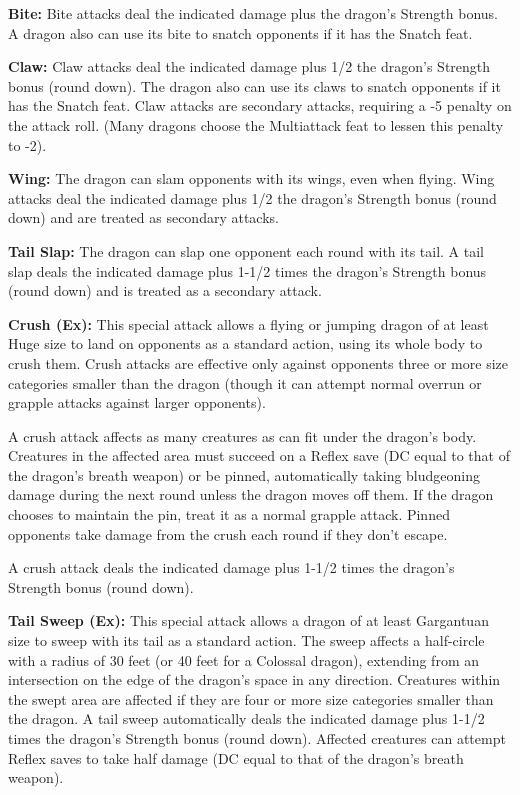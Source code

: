\documentclass{article}
\begin{document}
\textbf{Bite:} Bite attacks deal the indicated damage plus the dragon's Strength 
bonus. A dragon also can use its bite to snatch opponents if it has the Snatch 
feat.

\textbf{Claw:} Claw attacks deal the indicated damage plus 1/2 the dragon's Strength 
bonus (round down). The dragon also can use its claws to snatch opponents if it 
has the Snatch feat. Claw attacks are secondary attacks, requiring a -5 penalty 
on the attack roll. (Many dragons choose the Multiattack feat to lessen this penalty 
to -2).

\textbf{Wing:} The dragon can slam opponents with its wings, even when flying. 
Wing attacks deal the indicated damage plus 1/2 the dragon's Strength bonus (round 
down) and are treated as secondary attacks.

\textbf{Tail Slap:} The dragon can slap one opponent each round with its tail. 
A tail slap deals the indicated damage plus 1-1/2 times the dragon's Strength bonus 
(round down) and is treated as a secondary attack.

\textbf{Crush (Ex):} This special attack allows a flying or jumping dragon of at 
least Huge size to land on opponents as a standard action, using its whole body 
to crush them. Crush attacks are effective only against opponents three or more 
size categories smaller than the dragon (though it can attempt normal overrun or 
grapple attacks against larger opponents).

A crush attack affects as many creatures as can fit under the dragon's body. Creatures 
in the affected area must succeed on a Reflex save (DC equal to that of the dragon's 
breath weapon) or be pinned, automatically taking bludgeoning damage during the 
next round unless the dragon moves off them. If the dragon chooses to maintain 
the pin, treat it as a normal grapple attack. Pinned opponents take damage from 
the crush each round if they don't escape.

A crush attack deals the indicated damage plus 1-1/2 times the dragon's Strength 
bonus (round down).

\textbf{Tail Sweep (Ex):} This special attack allows a dragon of at least Gargantuan 
size to sweep with its tail as a standard action. The {\small{}sweep affects a 
half-circle with a radius of 30 feet (or 40 feet for a Colossal dragon), extending 
from an }intersection on the edge of the dragon's space in any direction. Creatures 
within the swept area are affected if they are four or more size categories smaller 
than the dragon. A tail sweep automatically deals the indicated damage plus 1-1/2 
times the dragon's Strength bonus (round down). Affected creatures can attempt 
Reflex saves to take half damage (DC equal to that of the dragon's breath weapon).
\end{document}
